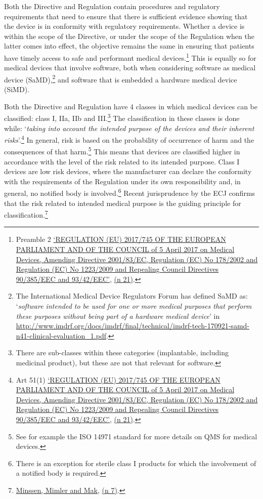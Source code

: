 \documentclass[
]{scrartcl}
\begin{document}
Both the Directive and Regulation contain procedures and regulatory requirements that need to ensure that there is sufficient evidence showing that the device is in conformity with regulatory requirements. Whether a device is within the scope of the Directive, or under the scope of the Regulation when the latter comes into effect, the objective remains the same in ensuring that patients have timely access to safe and performant medical devices.\footnote{Preamble 2 \protect\hyperlink{ref-REGULATIONEU2017a}{{`{REGULATION} ({EU}) 2017/745 {OF THE EUROPEAN PARLIAMENT AND OF THE COUNCIL} of 5 {April} 2017 on Medical Devices, Amending {Directive} 2001/83/{EC}, {Regulation} ({EC}) {No} 178/2002 and {Regulation} ({EC}) {No} 1223/2009 and Repealing {Council Directives} 90/385/{EEC} and 93/42/{EEC}'}}, \protect\hyperlink{ref-REGULATIONEU2017a}{(n 21)}.} This is equally so for medical devices that involve software, both when considering software as medical device (SaMD),\footnote{The International Medical Device Regulators Forum has defined SaMD as: `\emph{software intended to be used for one or more medical purposes that perform these purposes without being part of a hardware medical device}' in \url{http://www.imdrf.org/docs/imdrf/final/technical/imdrf-tech-170921-samd-n41-clinical-evaluation_1.pdf}.} and software that is embedded a hardware medical device (SiMD).

Both the Directive and Regulation have 4 classes in which medical devices can be classified: class I, IIa, IIb and III.\footnote{There are sub-classes within these categories (implantable, including medicinal product), but these are not that relevant for software.} The classification in these classes is done while: `\emph{taking into account the intended purpose of the devices and their inherent risks}'.\footnote{Art 51(1) \protect\hyperlink{ref-REGULATIONEU2017a}{{`{REGULATION} ({EU}) 2017/745 {OF THE EUROPEAN PARLIAMENT AND OF THE COUNCIL} of 5 {April} 2017 on Medical Devices, Amending {Directive} 2001/83/{EC}, {Regulation} ({EC}) {No} 178/2002 and {Regulation} ({EC}) {No} 1223/2009 and Repealing {Council Directives} 90/385/{EEC} and 93/42/{EEC}'}}, \protect\hyperlink{ref-REGULATIONEU2017a}{(n 21)}.} In general, risk is based on the probability of occurrence of harm and the consequences of that harm.\footnote{See for example the ISO 14971 standard for more details on QMS for medical devices.} This means that devices are classified higher in accordance with the level of the risk related to its intended purpose. Class I devices are low risk devices, where the manufacturer can declare the conformity with the requirements of the Regulation under its own responsibility and, in general, no notified body is involved.\footnote{There is an exception for sterile class I products for which the involvement of a notified body is required.} Recent jurisprudence by the ECJ confirms that the risk related to intended medical purpose is the guiding principle for classification.\footnote{\protect\hyperlink{ref-minssenWhenDoesStandAlone2020a}{Minssen, Mimler and Mak}, \protect\hyperlink{ref-minssenWhenDoesStandAlone2020a}{(n 7)}.}
\end{document}
